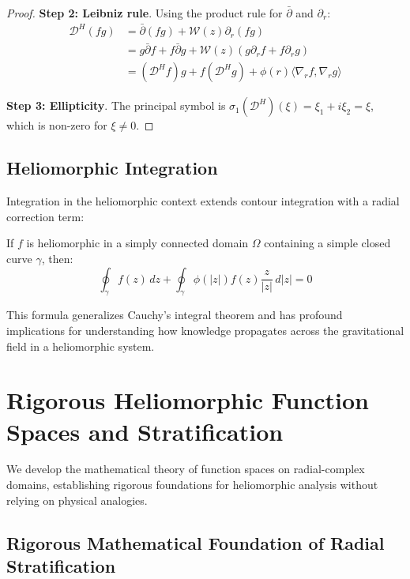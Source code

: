 \begin{definition}
\begin{proof}
\textbf{Step 2: Leibniz rule}. Using the product rule for $\bar{\partial}$ and $\partial_r$:
\begin{align}
\mathcal{D}^H(fg) &= \bar{\partial}(fg) + \mathcal{W}(z) \partial_r(fg)\\
&= g\bar{\partial}f + f\bar{\partial}g + \mathcal{W}(z)(g\partial_r f + f\partial_r g)\\
&= (\mathcal{D}^H f)g + f(\mathcal{D}^H g) + \phi(r) \langle \nabla_r f, \nabla_r g \rangle
\end{align}

\textbf{Step 3: Ellipticity}. The principal symbol is $\sigma_1(\mathcal{D}^H)(\xi) = \xi_1 + i\xi_2 = \xi$, which is non-zero for $\xi \neq 0$.
\end{proof}

\subsection{Heliomorphic Integration}

Integration in the heliomorphic context extends contour integration with a radial correction term:

\begin{theorem}
If $f$ is heliomorphic in a simply connected domain $\Omega$ containing a simple closed curve $\gamma$, then:
\begin{equation}
\oint_{\gamma} f(z) \, dz + \oint_{\gamma} \phi(|z|) f(z) \frac{z}{|z|} \, d|z| = 0
\end{equation}
\end{theorem}

This formula generalizes Cauchy's integral theorem and has profound implications for understanding how knowledge propagates across the gravitational field in a heliomorphic system.

\section{Rigorous Heliomorphic Function Spaces and Stratification}

We develop the mathematical theory of function spaces on radial-complex domains, establishing rigorous foundations for heliomorphic analysis without relying on physical analogies.

\subsection{Rigorous Mathematical Foundation of Radial Stratification}


\end{definition}
